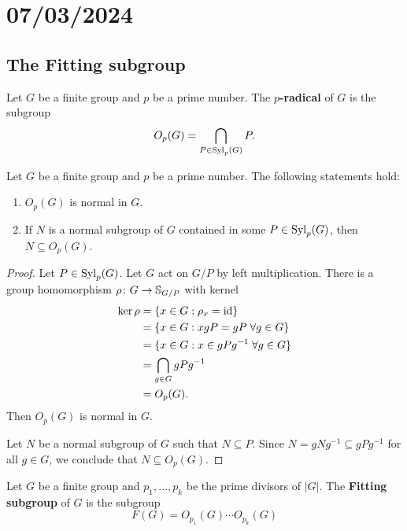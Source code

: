 \section{07/03/2024}

\subsection{The Fitting subgroup}

\begin{definition}
Let $G$ be a finite group and $p$ be a prime number. 
The \textbf{$p$-radical} of $G$ is the subgroup 
\[
O_p(G)=\bigcap_{P\in\mathrm{Syl}_p(G)}P.
\]
\end{definition}

\begin{lemma}
\label{lem:core:Op(G)}
Let $G$ be a finite group and $p$ be a prime number. The following statements hold: 
\begin{enumerate}
    \item $O_p(G)$ is normal in $G$.
    \item If $N$ is a normal subgroup of $G$ contained in some 
    $P\in\mathrm{Syl}_p(G)$, then $N\subseteq O_p(G)$.
\end{enumerate}
\end{lemma}

\begin{proof}
Let $P\in\mathrm{Syl}_p(G)$. Let $G$ act on $G/P$ by left multiplication. There is a group homomorphism 
$\rho\colon G\to\mathbb{S}_{G/P}$ with kernel 
\begin{align*}
		\ker\rho&=\{x\in G:\rho_x=\operatorname{id}\}\\
		&=\{x\in G:xgP=gP\;\forall g\in G\}\\
		&=\{x\in G:x\in gPg^{-1}\;\forall g\in G\}\\
    &=\bigcap_{g\in G}gPg^{-1}\\
    &=O_p(G).
\end{align*}
Then $O_p(G)$ is normal in $G$.

Let $N$ be a normal subgroup of $G$ such that $N\subseteq P$. Since 
$N=gNg^{-1}\subseteq gPg^{-1}$ for all $g\in G$, we conclude that 
$N\subseteq O_p(G)$.
\end{proof}

\begin{definition}
Let $G$ be a finite group and $p_1,\dots,p_k$ be the prime divisors of 
$|G|$. The \textbf{Fitting subgroup} of $G$ is the subgroup 
\[
F(G)=O_{p_1}(G)\cdots O_{p_k}(G)
\]
\end{definition}

